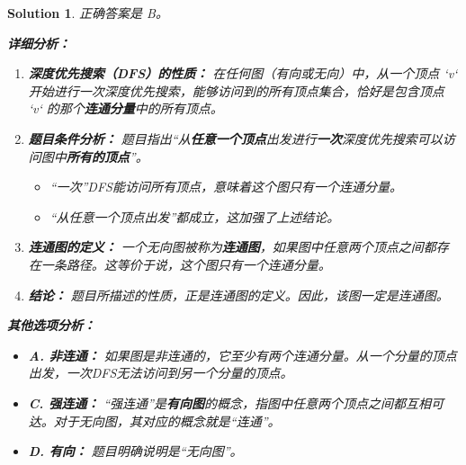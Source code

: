 \documentclass[UTF8]{report}
\newtheorem{solution}{Solution}
\theoremstyle{MyLineTheoremStyle} %
\theoremstyle{MyBlockTheoremStyle} %
\theoremstyle{MySubsubsectionStyle} %
\begin{document}
\begin{solution}
正确答案是 B。

\textbf{详细分析：}

\begin{enumerate}
    \item \textbf{深度优先搜索（DFS）的性质：}
    在任何图（有向或无向）中，从一个顶点 `v` 开始进行一次深度优先搜索，能够访问到的所有顶点集合，恰好是包含顶点 `v` 的那个\textbf{连通分量}中的所有顶点。

    \item \textbf{题目条件分析：}
    题目指出“从\textbf{任意一个顶点}出发进行\textbf{一次}深度优先搜索可以访问图中\textbf{所有的顶点}”。
    \begin{itemize}
        \item “一次”DFS能访问所有顶点，意味着这个图只有一个连通分量。
        \item “从任意一个顶点出发”都成立，这加强了上述结论。
    \end{itemize}

    \item \textbf{连通图的定义：}
    一个无向图被称为\textbf{连通图}，如果图中任意两个顶点之间都存在一条路径。这等价于说，这个图只有一个连通分量。

    \item \textbf{结论：}
    题目所描述的性质，正是连通图的定义。因此，该图一定是连通图。
\end{enumerate}

\textbf{其他选项分析：}
\begin{itemize}
    \item \textbf{A. 非连通：} 如果图是非连通的，它至少有两个连通分量。从一个分量的顶点出发，一次DFS无法访问到另一个分量的顶点。
    \item \textbf{C. 强连通：} “强连通”是\textbf{有向图}的概念，指图中任意两个顶点之间都互相可达。对于无向图，其对应的概念就是“连通”。
    \item \textbf{D. 有向：} 题目明确说明是“无向图”。
\end{itemize}
\end{solution}
\end{document}
